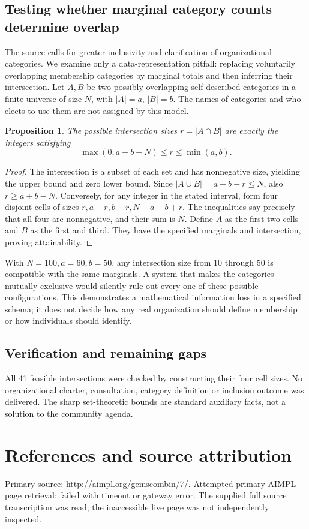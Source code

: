 \documentclass[11pt]{article}
\newtheorem{proposition}{Proposition}
\begin{document}
\subsection{Testing whether marginal category counts determine overlap}
The source calls for greater inclusivity and clarification of organizational categories. We examine only a data-representation pitfall: replacing voluntarily overlapping membership categories by marginal totals and then inferring their intersection. Let $A,B$ be two possibly overlapping self-described categories in a finite universe of size $N$, with $|A|=a$, $|B|=b$. The names of categories and who elects to use them are not assigned by this model.
\begin{proposition}
The possible intersection sizes $r=|A\cap B|$ are exactly the integers satisfying
\[
\max(0,a+b-N)\le r\le\min(a,b).
\]
\end{proposition}
\begin{proof}
The intersection is a subset of each set and has nonnegative size, yielding the upper bound and zero lower bound. Since $|A\cup B|=a+b-r\le N$, also $r\ge a+b-N$. Conversely, for any integer in the stated interval, form four disjoint cells of sizes $r,a-r,b-r,N-a-b+r$. The inequalities say precisely that all four are nonnegative, and their sum is $N$. Define $A$ as the first two cells and $B$ as the first and third. They have the specified marginals and intersection, proving attainability.
\end{proof}
With $N=100,a=60,b=50$, any intersection size from 10 through 50 is compatible with the same marginals. A system that makes the categories mutually exclusive would silently rule out every one of these possible configurations. This demonstrates a mathematical information loss in a specified schema; it does not decide how any real organization should define membership or how individuals should identify.
\subsection{Verification and remaining gaps}
All 41 feasible intersections were checked by constructing their four cell sizes. No organizational charter, consultation, category definition or inclusion outcome was delivered. The sharp set-theoretic bounds are standard auxiliary facts, not a solution to the community agenda.

\section{References and source attribution}
Primary source: \url{http://aimpl.org/gemscombin/7/}. Attempted primary AIMPL page retrieval; failed with timeout or gateway error. The supplied full source transcription was read; the inaccessible live page was not independently inspected.
\end{document}
